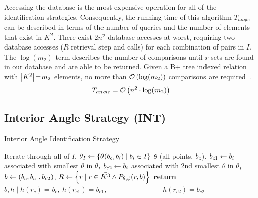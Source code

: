 Accessing the database is the most expensive operation for all of the identification strategies.
Consequently, the running time of this algorithm $T_{angle}$ can be described in terms of the number of queries and
the number of elements that exist in $K^2$.
There exist $2n^2$ database accesses at worst, requiring two database accesses ($R$ retrieval step and 
calls) for each combination of pairs in $I$.
The $\log (m_2)$ term describes the number of comparisons until $r$ sets are found in our database and are able to
be returned.
Given a B+ tree indexed relation with $\left| K^2 \right| \!=\! m_2$ elements, no more than $\mathcal{O} \left( \log(m_2) \right)$
comparisons are required~\cite{patel:advanceTreeStructures}.
\begin{equation}\label{eq:complexityAngle}
    T_{angle} = \bigO\left( n^2 \cdot \log(m_2) \right)
\end{equation}


\subsection{Interior Angle Strategy (INT)}\label{subsec:interiorAngleMethod}
\begin{algorithm}
    \caption{Interior Angle Identification Strategy} \label{algorithm:interiorAngleIdentification}
    \begin{algorithmic}[1]
          \Comment Iterate through all of $I$.
        \State $\theta_I \gets \{\theta(b_c, b_i) \mid b_i \in I\}$ \Comment $\theta$
        (all points, $b_c$).
        \State $b_{c1} \gets b_i$ associated with smallest $\theta$ in $\theta_I$
        \State $b_{c2} \gets b_i$ associated with 2nd smallest $\theta$ in $\theta_I$
        \State $b \gets \left(b_c, b_{c1}, b_{c2}\right)$, $R \gets \left\{  r \mid r \in \bar{K^3} \land
        P_{\theta, \phi}(r, b)  \right\}$
        \State \textbf{return} $b, h \mid h(r_c) = b_{c}, \ h(r_{c1}) = b_{c1},$
        \State \ \ \ \ \ \ \ \ \ \ \ \ \ \ \  $h(r_{c2}) = b_{c2}$
        \EndIf
        \EndFor
        \EndFunction
    \end{algorithmic}
\end{algorithm}

